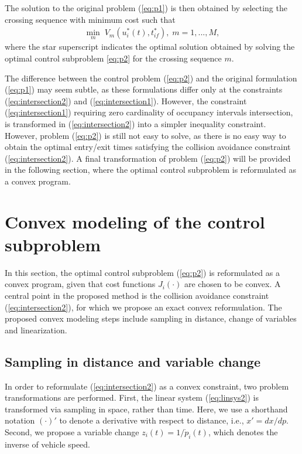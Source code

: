 \documentclass[letterpaper,10pt,conference]{ieeeconf}
\begin{document}
The solution to the original problem (\ref{eq:p1}) is then obtained by selecting the crossing sequence with minimum cost such that
\begin{align}
\min_{m}\; V_{m}(u_i^*(t), t_{if}^*), \;  m=1,...,M,
\end{align}
where the star superscript indicates the optimal solution obtained by solving the optimal control subproblem \eqref{eq:p2} for the crossing sequence $m$.

The difference between the control problem (\ref{eq:p2}) and the original formulation (\ref{eq:p1}) may seem subtle, as these formulations differ only at the constraints (\ref{eq:intersection2}) and (\ref{eq:intersection1}). However, the constraint (\ref{eq:intersection1}) requiring zero cardinality of occupancy intervals intersection, is transformed in (\ref{eq:intersection2}) into a simpler inequality constraint. However, problem (\ref{eq:p2}) is still not easy to solve, as there is no easy way to obtain the optimal entry/exit times satisfying the collision avoidance constraint (\ref{eq:intersection2}). A final transformation of problem (\ref{eq:p2}) will be provided in the following section, where the optimal control subproblem is reformulated as a convex program.

\section{Convex modeling of the control subproblem} \label{sec:convexmodeling}
In this section, the optimal control subproblem (\ref{eq:p2}) is reformulated as a convex program, given that cost functions $J_i(\cdot)$ are chosen to be convex. A central point in the proposed method is the collision avoidance constraint (\ref{eq:intersection2}), for which we propose an exact convex reformulation. The proposed convex modeling steps include sampling in distance, change of variables and linearization. 

\subsection{Sampling in distance and variable change} \label{sec:samplingdistance}

In order to reformulate (\ref{eq:intersection2}) as a convex constraint, two problem transformations are performed. First, the linear system (\ref{eq:linsys2}) is transformed via sampling in space, rather than time. Here, we use a shorthand notation $(\cdot)'$ to denote a derivative with respect to distance, i.e., $x'=d x/dp$. Second, we propose a variable change $z_i(t)=1/\dot p_i(t)$, which denotes the inverse of vehicle speed.
\end{document}
